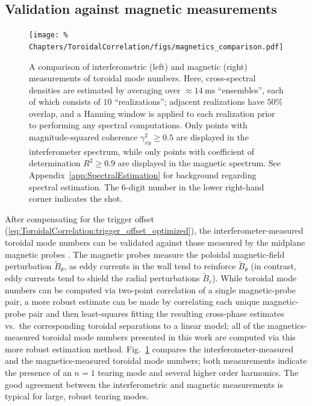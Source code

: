 \subsection{Validation against magnetic measurements}
\label{sec:ToroidalCorrelation:ImplementationDetails:validation_agains_magnetics}
\begin{figure}
  \centering
  \texttt{[image: \%
    Chapters/ToroidalCorrelation/figs/magnetics\_comparison.pdf]}
  \caption[Interferometric \& magnetic measurement of toroidal mode numbers]{%
    A comparison of interferometric (left) and magnetic (right)
    measurements of toroidal mode numbers.
    Here, cross-spectral densities are estimated
    by averaging over $\approx \SI{14}{\milli\second}$ ``ensembles'',
    each of which consists of $10$ ``realizations'';
    adjacent realizations have $50\%$ overlap, and
    a Hanning window is applied to each realization
    prior to performing any spectral computations.
    Only points with magnitude-squared coherence
    $\gamma_{xy}^2 \geq 0.5$ are displayed
    in the interferometer spectrum, while
    only points with coefficient of determination
    $R^2 \geq 0.9$ are displayed
    in the magnetic spectrum.
    See Appendix~\ref{app:SpectralEstimation}
    for background regarding spectral estimation.
    The $6$-digit number in the lower right-hand corner
    indicates the \diiid\space shot.
  }
\label{fig:ToroidalCorrelation:magnetics_comparison}
\end{figure}

After compensating for the trigger offset
(\ref{eq:ToroidalCorrelation:trigger_offset_optimized}),
the interferometer-measured toroidal mode numbers can be validated against
those measured by the \diiid\space midplane magnetic probes
\cite{strait_rsi06}.
The magnetic probes measure the
poloidal magnetic-field perturbation $\tilde{B}_{\theta}$,
as eddy currents in the wall tend to reinforce $\tilde{B}_{\theta}$
(in contrast, eddy currents tend to shield
the radial perturbations $\tilde{B}_{r}$).
While toroidal mode numbers can be computed
via two-point correlation of a single magnetic-probe pair,
a more robust estimate can be made
by correlating each unique magnetic-probe pair and
then least-squares fitting
the resulting cross-phase estimates vs.\
the corresponding toroidal separations to a linear model;
all of the magnetics-measured toroidal mode numbers
presented in this work
are computed via this more robust estimation method.
Fig.~\ref{fig:ToroidalCorrelation:magnetics_comparison}
compares the interferometer-measured and the magnetics-measured
toroidal mode numbers;
both measurements indicate the presence of an $n = 1$ tearing mode and
several higher order harmonics.
The good agreement between the interferometric and magnetic measurements
is typical for large, robust tearing modes.



